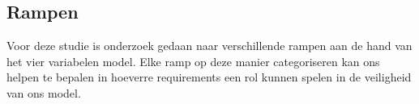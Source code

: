 \documentclass{article}
\begin{document}
	
	\subsection{Rampen}
	
	\newline \indent Voor deze studie is onderzoek gedaan naar verschillende rampen aan de hand van het vier variabelen model.
	Elke ramp op deze manier categoriseren  kan ons helpen te bepalen in hoeverre requirements een rol kunnen spelen in de veiligheid van ons model.
	
	
	
\end{document}

